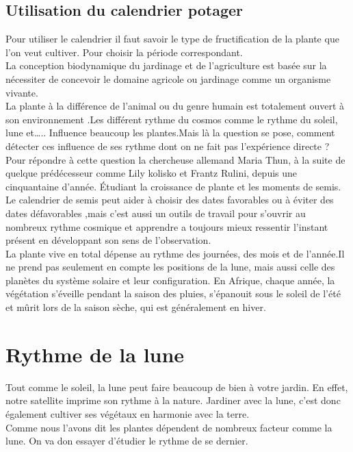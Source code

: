 \subsection{Utilisation du calendrier potager} 
Pour utiliser le calendrier il faut savoir le type de fructification de la plante que l’on veut cultiver. Pour  choisir la période correspondant.\\
La conception biodynamique du jardinage et de l’agriculture est basée sur la nécessiter de concevoir  le domaine  agricole  ou jardinage comme un organisme vivante.\\

La plante à la différence de l’animal ou du genre humain est totalement ouvert à son environnement .Les différent rythme du cosmos comme le rythme du soleil, lune et….. Influence beaucoup les plantes.Mais là la question se pose, comment  détecter ces influence de ses rythme dont on ne fait pas l’expérience directe ?\\Pour répondre à cette question la chercheuse allemand  Maria  Thun, à la suite  de quelque  prédécesseur  comme Lily kolisko  et Frantz  Rulini, depuis une cinquantaine d’année. Étudiant la croissance de plante et les moments de semis.\\

Le calendrier de semis  peut aider  à choisir  des  dates favorables ou à éviter  des dates  défavorables ,mais  c’est  aussi  un outils de travail pour s’ouvrir au nombreux rythme  cosmique  et apprendre  a toujours  mieux  ressentir l’instant présent  en développant  son sens  de l’observation.\\
La plante vive en total dépense au rythme des journées, des mois et de l’année.Il ne prend pas seulement en compte les positions de la lune, mais aussi celle des planètes du système solaire et leur configuration.
En Afrique, chaque année, la végétation s'éveille pendant la saison des pluies, s'épanouit sous le soleil de l'été et mûrit lors de la saison sèche, qui est généralement en hiver. \\
\section{Rythme de la lune}
Tout comme le soleil, la lune peut faire beaucoup de bien à votre jardin. En effet, notre satellite imprime son rythme à la nature. Jardiner avec la lune, c’est donc également cultiver ses végétaux en harmonie avec la terre.\\
Comme nous l’avons dit les plantes dépendent de nombreux facteur comme la lune. On va don essayer d’étudier le rythme de se dernier.

